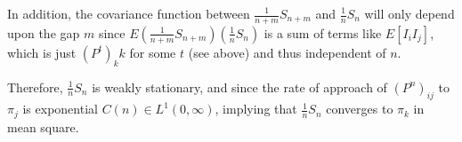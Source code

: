 \documentclass[12pt]{article}
\theoremstyle{plain}
\theoremstyle{definition}
\theoremstyle{remark}
\begin{document}
\begin{enumerate}
\begin{enumerate}
        In addition, the covariance function between
        $\frac{1}{n+m}S_{n+m}$ and $\frac{1}{n}S_n$ will only depend
        upon the gap $m$ since
        $E\left(\frac{1}{n+m}S_{n+m}\right)\left(\frac{1}{n}S_n\right)$
        is a sum of terms like $E[I_iI_j]$, which is just $(P^t)_kk$ for
        some $t$ (see above) and thus independent of $n$.

        Therefore, $\frac{1}{n}S_n$ is weakly stationary, and since the
        rate of approach of $(P^n)_{ij}$ to $\pi_j$ is exponential
        $C(n)\in L^1(0,\infty)$, implying that $\frac{1}{n}S_n$
        converges to $\pi_k$ in mean square.


    \end{enumerate}


\end{enumerate}
\end{document}
